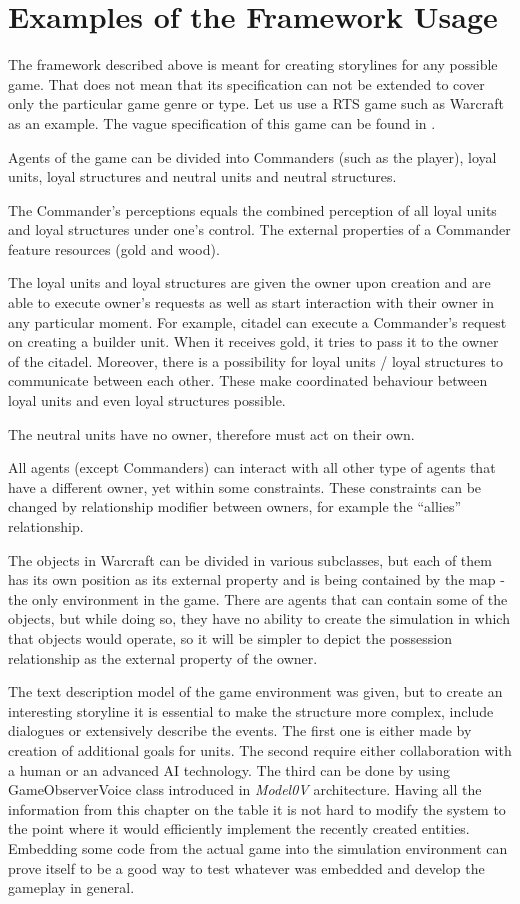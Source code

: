 \section{Examples of the Framework Usage}
The framework described above is meant for creating storylines for any possible game. That does not mean that its specification can not be extended to cover only the particular game genre or type. Let us use a RTS game such as Warcraft as an example.
The vague specification of this game can be found in \cite{warcraft}.
\begin{example}
Agents of the game can be divided into Commanders (such as the player), loyal units, loyal structures and neutral units and neutral structures.\par
The Commander's perceptions equals the combined perception of all loyal units and loyal structures under one's control. The external properties of a Commander feature resourc\breve{}es (gold and wood).\par
The loyal units and loyal structures are given the owner upon creation and are able to execute owner's requests as well as start interaction with their owner in any particular moment. For example, citadel can execute a Commander's request on creating a builder unit. When it receives gold, it tries to pass it to the owner of the citadel. Moreover, there is a possibility for loyal units / loyal structures to communicate between each other. These make coordinated behaviour between loyal units and even loyal structures possible.\par
 The neutral units have no owner, therefore must act on their own. \par
 All agents (except Commanders) can interact with all other type of agents that have a different owner, yet within some constraints. These constraints can be changed by relationship modifier between owners, for example the ``allies'' relationship.\par
  The objects in Warcraft can be divided in various subclasses, but each of them has its own position as its external property and is being contained by the map - the only environment in the game. There are agents that can contain some of the objects, but while doing so, they have no ability to create the simulation in which that objects would operate, so it will be simpler to depict the possession relationship as the external property of the owner.
 \end{example}
  The text description model of the game environment was given, but to create an interesting storyline it is essential to make the structure more complex, include dialogues or extensively describe the events. The first one is either made by creation of additional goals for units. The second require either collaboration with a human or an advanced AI technology. The third can be done by using GameObserverVoice class introduced in \textit{Model0V} architecture. Having all the information from this chapter on the table it is not hard to modify the system to the point where it would efficiently implement the recently created entities. Embedding some code from the actual game into the simulation environment can prove itself to be a good way to test whatever was embedded and develop the gameplay in general. 